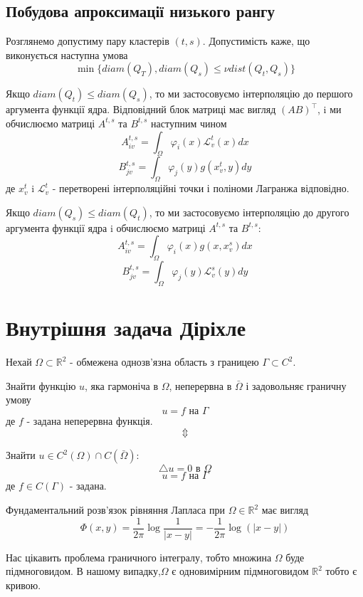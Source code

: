 \documentclass[12pt]{report}
\begin{document}
	\subsection{Побудова апроксимації низького рангу}
	\hspace{0.8cm} Розглянемо допустиму пару кластерів $(t,s)$. Допустимість каже, що виконується наступна умова
	$$\min\{diam(Q_T),diam(Q_s)\le \nu dist(Q_t,Q_s)\}$$
	\par Якщо $diam(Q_t)\le diam(Q_s)$, то ми застосовуємо інтерполяцію до першого аргумента функції ядра. Відповідний блок матриці має вигляд $(AB)^\top$, i ми обчислюємо матриці $A^{t,s}$ та $B^{t,s}$ наступним чином
	$$A_{iv}^{t,s}=\int_{\Omega}\varphi_i(x)\mathcal{L}_v^t(x)dx$$
	$$B_{jv}^{t,s}=\int_{\Omega}\varphi_j(y)g(x_v^t,y)dy$$
	де $x_v^t$ i $\mathcal{L}_v^t$ - перетворені інтерполяційні точки і поліноми Лагранжа відповідно.
	\par Якщо $diam(Q_s)\le diam(Q_t)$, то ми застосовуємо інтерполяцію до другого аргумента функції ядра i обчислюємо матриці $A^{t,s}$ та $B^{t,s}$:
	$$A_{iv}^{t,s}=\int_{\Omega}\varphi_i(x)g(x,x_v^s)dx$$
	$$B_{jv}^{t,s}=\int_{\Omega}\varphi_j(y)\mathcal{L}_v^s(y)dy$$
	\section{Внутрішня задача Діріхле}
	\hspace{0.8cm} Нехай $\Omega\subset\mathbb{R}^2$ - обмежена однозв'язна область з границею $\Gamma\subset C^2$.
	\par Знайти функцію $u$, яка гармоніча в $\Omega$, неперервна в $\bar{\Omega}$ і задовольняє граничну умову $$u=f \text{ на }\Gamma$$
	де $f$ - задана неперервна функція. $$\Updownarrow$$
	\par Знайти $u\in C^2(\Omega)\cap C(\bar{\Omega}):$
	$$\triangle u=0 \text{ в }\Omega$$
	$$u=f\text{ на }\Gamma$$
	де $f\in C(\Gamma)$ - задана.
	\par Фундаментальний розв'язок рівняння Лапласа при $\Omega\in\mathbb{R}^2$ має вигляд $$\Phi(x,y)=\frac{1}{2\pi}\log\frac{1}{|x-y|}=-\frac{1}{2\pi}\log(|x-y|)$$
	\par Нас цікавить проблема граничного інтегралу, тобто множина $\Omega$ буде підмноговидом. В нашому випадку,$\Omega$ є одновимірним підмноговидом $\mathbb{R}^2$ тобто є кривою.
\end{document}
